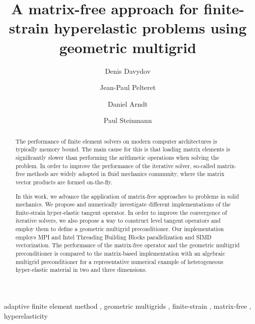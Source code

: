 \documentclass[preprint,12pt,times]{elsarticle}
\begin{document}
\begin{frontmatter}
  \title{
  A matrix-free approach for finite-strain hyperelastic problems using geometric multigrid
  }

  \author[a]{Denis Davydov}

  \author[a]{Jean-Paul Pelteret}

  \author[b]{Daniel Arndt}

  \author[a]{Paul Steinmann}


  \address[a]{Chair of Applied Mechanics,
  Friedrich-Alexander-Universit\"{a}t Erlangen-N\"{u}rnberg,
  Egerlandstr.\ 5, 91058 Erlangen, Germany}

  \address[b]{Interdisciplinary Center for Scientific Computing (IWR),
      Heidelberg University,
      Im Neuenheimer Feld 205,
      69120 Heidelberg,
      Germany}


  \begin{abstract}
    The performance of finite element solvers on modern computer architectures is typically memory bound.
    The main cause for this is that loading matrix elements is significantly slower than performing the arithmetic operations when solving the problem.
    In order to improve the performance of the iterative solver, so-called matrix-free methods are
    widely adopted in fluid mechanics community, where the matrix vector products are formed on-the-fly.

    In this work, we advance the application of matrix-free approaches to problems in solid mechanics.
    We propose and numerically investigate different implementations of the finite-strain hyper-elastic tangent operator.
    In order to improve the convergence of iterative solvers, we also propose a way to construct level tangent operators
    and employ them to define a geometric multigrid preconditioner.
    Our implementation employs MPI and Intel Threading Building Blocks parallelization and SIMD vectorization.
    The performance of the matrix-free operator and the geometric multigrid preconditioner is compared to the matrix-based implementation with an algebraic multigrid preconditioner for a representative numerical example of heterogeneous hyper-elastic material in two and three dimensions.
  \end{abstract}


  \begin{keyword}
      adaptive finite element method \sep
      geometric multigrids \sep
      finite-strain \sep
      matrix-free \sep
      hyperelasticity
  \end{keyword}

  \end{frontmatter}
\end{document}
